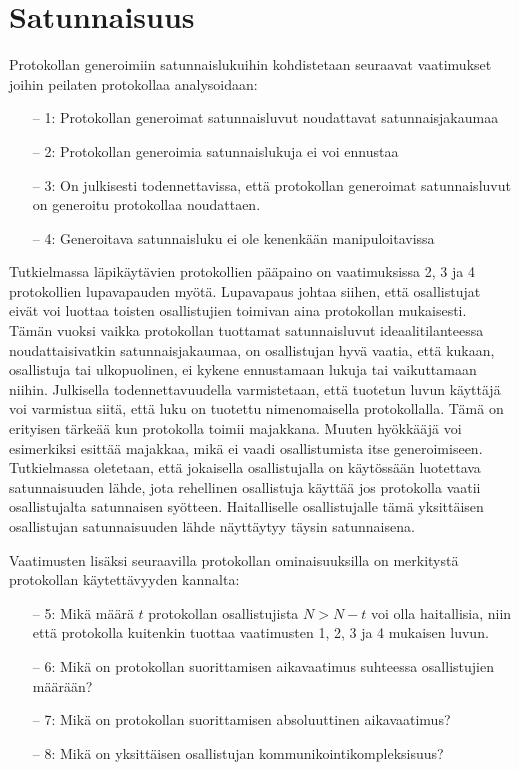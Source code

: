 \section{Satunnaisuus}

Protokollan generoimiin satunnaislukuihin kohdistetaan seuraavat vaatimukset joihin peilaten protokollaa analysoidaan:
\begin{itemize}
    \item[--] 1: Protokollan generoimat satunnaisluvut noudattavat satunnaisjakaumaa
    \item[--] 2: Protokollan generoimia satunnaislukuja ei voi ennustaa
    \item[--] 3: On julkisesti todennettavissa, että protokollan generoimat satunnaisluvut on generoitu protokollaa noudattaen.
    \item[--] 4: Generoitava satunnaisluku ei ole kenenkään manipuloitavissa
\end{itemize}\textbf{}

Tutkielmassa läpikäytävien protokollien pääpaino on vaatimuksissa 2, 3 ja 4 protokollien lupavapauden myötä. Lupavapaus johtaa siihen, että osallistujat eivät voi luottaa toisten osallistujien toimivan aina protokollan mukaisesti. Tämän vuoksi vaikka protokollan tuottamat satunnaisluvut ideaalitilanteessa noudattaisivatkin satunnaisjakaumaa, on osallistujan hyvä vaatia, että kukaan, osallistuja tai ulkopuolinen, ei kykene ennustamaan lukuja tai vaikuttamaan niihin. Julkisella todennettavuudella varmistetaan, että 
tuotetun luvun käyttäjä voi varmistua siitä, että luku on tuotettu nimenomaisella protokollalla. Tämä on erityisen tärkeää kun protokolla toimii majakkana. Muuten hyökkääjä voi esimerkiksi esittää majakkaa, mikä ei vaadi osallistumista itse generoimiseen. Tutkielmassa oletetaan, että jokaisella osallistujalla on käytössään luotettava satunnaisuuden lähde, jota rehellinen osallistuja käyttää jos protokolla vaatii osallistujalta satunnaisen syötteen. Haitalliselle osallistujalle tämä yksittäisen osallistujan satunnaisuuden lähde näyttäytyy täysin satunnaisena.

Vaatimusten lisäksi seuraavilla protokollan ominaisuuksilla on merkitystä protokollan käytettävyyden kannalta:

\begin{itemize}
    \item[--] 5: Mikä määrä $t$ protokollan osallistujista $N > N - t$ voi olla haitallisia, niin että protokolla kuitenkin tuottaa vaatimusten 1, 2, 3 ja 4 mukaisen luvun.
    \item[--] 6: Mikä on protokollan suorittamisen aikavaatimus suhteessa osallistujien määrään?
    \item[--] 7: Mikä on protokollan suorittamisen absoluuttinen aikavaatimus?
    \item[--] 8: Mikä on yksittäisen osallistujan kommunikointikompleksisuus?
\end{itemize}